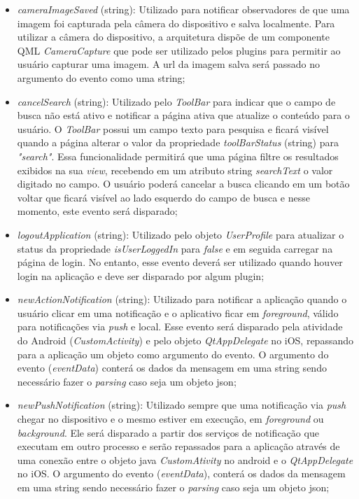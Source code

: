 \begin{itemize}
	\begin{itemize}
		\item \textit{cameraImageSaved} (string): Utilizado para notificar observadores de que uma imagem foi capturada pela câmera do dispositivo e salva localmente. Para utilizar a câmera do dispositivo, a arquitetura dispõe de um componente QML \textit{CameraCapture} que pode ser utilizado pelos plugins para permitir ao usuário capturar uma imagem. A url da imagem salva será passado no argumento do evento como uma string;

		\item \textit{cancelSearch} (string): Utilizado pelo \textit{ToolBar} para indicar que o campo de busca não está ativo e notificar a página ativa que atualize o conteúdo para o usuário. O \textit{ToolBar} possui um campo texto para pesquisa e ficará visível quando a página alterar o valor da propriedade \textit{toolBarStatus} (string) para \textit{"search"}. Essa funcionalidade permitirá que uma página filtre os resultados exibidos na sua \textit{view}, recebendo em um atributo string \textit{searchText} o valor digitado no campo. O usuário poderá cancelar a busca clicando em um botão voltar que ficará visível ao lado esquerdo do campo de busca e nesse momento, este evento será disparado;

		\item \textit{logoutApplication} (string): Utilizado pelo objeto \textit{UserProfile} para atualizar o status da propriedade \textit{isUserLoggedIn} para \textit{false} e em seguida carregar na página de login. No entanto, esse evento deverá ser utilizado quando houver login na aplicação e deve ser disparado por algum plugin;

		\item \textit{newActionNotification} (string): Utilizado para notificar a aplicação quando o usuário clicar em uma notificação e o aplicativo ficar em \textit{foreground}, válido para notificações via \textit{push} e local. Esse evento será disparado pela atividade do Android (\textit{CustomActivity}) e pelo objeto \textit{QtAppDelegate} no iOS, repassando para a aplicação um objeto como argumento do evento. O argumento do evento (\textit{eventData}) conterá os dados da mensagem em uma string sendo necessário fazer o \textit{parsing} caso seja um objeto json;

		\item \textit{newPushNotification} (string): Utilizado sempre que uma notificação via \textit{push} chegar no dispositivo e o mesmo estiver em execução, em \textit{foreground} ou \textit{background}. Ele será disparado a partir dos serviços de notificação que executam em outro processo e serão repassados para a aplicação através de uma conexão entre o objeto java \textit{CustomAtivity} no android e o \textit{QtAppDelegate} no iOS. O argumento do evento (\textit{eventData}), conterá os dados da mensagem em uma string sendo necessário fazer o \textit{parsing} caso seja um objeto json;


\end{itemize}
\end{itemize}

